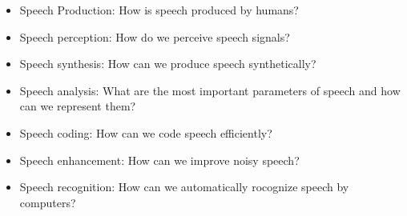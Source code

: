 
\thispagestyle{plain}



\begin{corollary}

	\hspace*{10mm}
	
	\vspace{5mm} %
	
	\begin{itemize}
			\item Speech Production: How is speech produced by humans?
			\item Speech perception: How do we perceive speech signals?
			\item Speech synthesis: How can we produce speech synthetically?
			\item Speech analysis: What are the most important parameters of speech and how can we represent them?
			\item Speech coding: How can we code speech efficiently?
			\item Speech enhancement: How can we improve noisy speech?
			\item Speech recognition: How can we automatically rocognize speech by computers?
	\end{itemize}
\end{corollary}

\clearpage

